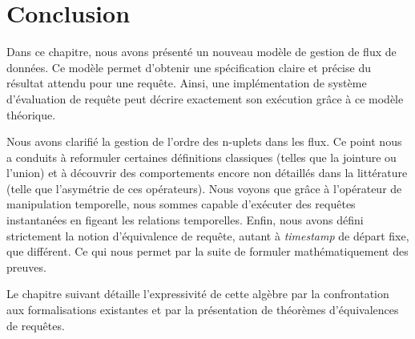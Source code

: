 \section{Conclusion}\label{sec:contrib:astral:conclusion}
Dans ce chapitre, nous avons présenté un nouveau modèle de gestion de flux de données. Ce modèle permet d'obtenir une spécification claire et précise du résultat attendu pour une requête. Ainsi, une implémentation de système d'évaluation de requête peut décrire exactement son exécution grâce à ce modèle théorique.

Nous avons clarifié la gestion de l'ordre des n-uplets dans les flux. Ce point nous a conduits à reformuler certaines définitions classiques (telles que la jointure ou l'union) et à découvrir des comportements encore non détaillés dans la littérature (telle que l'asymétrie de ces opérateurs). Nous voyons que grâce à l'opérateur de manipulation temporelle, nous sommes capable d'exécuter des requêtes instantanées en figeant les relations temporelles. Enfin, nous avons défini strictement la notion d'équivalence de requête, autant à \textit{timestamp} de départ fixe, que différent. Ce qui nous permet par la suite de formuler mathématiquement des preuves.

Le chapitre suivant détaille l'expressivité de cette algèbre par la confrontation aux formalisations existantes et par la présentation de théorèmes d'équivalences de requêtes.